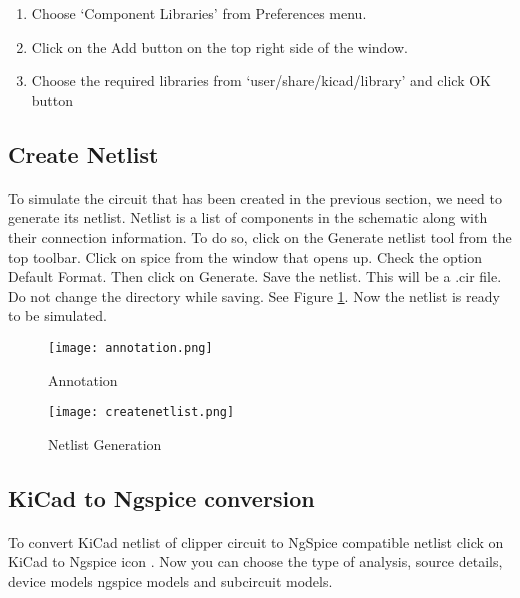 \begin{enumerate}
\item
Choose `Component Libraries' from Preferences menu.

\item
Click on the Add button on the top right side of the window.

\item
Choose the required libraries from `user/share/kicad/library' and click OK button

\end{enumerate}

\subsection*{Create Netlist}

\paragraph{}To simulate the circuit that has been created in the previous section, we need to generate
its netlist. Netlist is a list of components in the schematic along with their connection
information. To do so, click on the Generate netlist tool from the top toolbar. Click on
spice from the window that opens up. Check the option Default Format. Then click
on Generate. Save the netlist. This will be a .cir file. Do
not change the directory while saving. See Figure \ref{createnetlistclamp}.
 Now the netlist is ready to be simulated. 
\begin{figure}
\begin{minipage}{.5\textwidth}
  \centering
  \texttt{[image: annotation.png]}
  \caption{Annotation}
  \label{annotationclamp}
\end{minipage}%
\begin{minipage}{.5\textwidth}
  \centering
  \texttt{[image: createnetlist.png]}
  \caption{Netlist Generation}
  \label{createnetlistclamp}
\end{minipage}
\end{figure}

\subsection*{KiCad to Ngspice conversion}

\paragraph{} To convert KiCad netlist of clipper circuit to NgSpice
compatible netlist click on KiCad to Ngspice icon .  Now you can choose the type of analysis, source details, device models ngspice models and subcircuit models.


